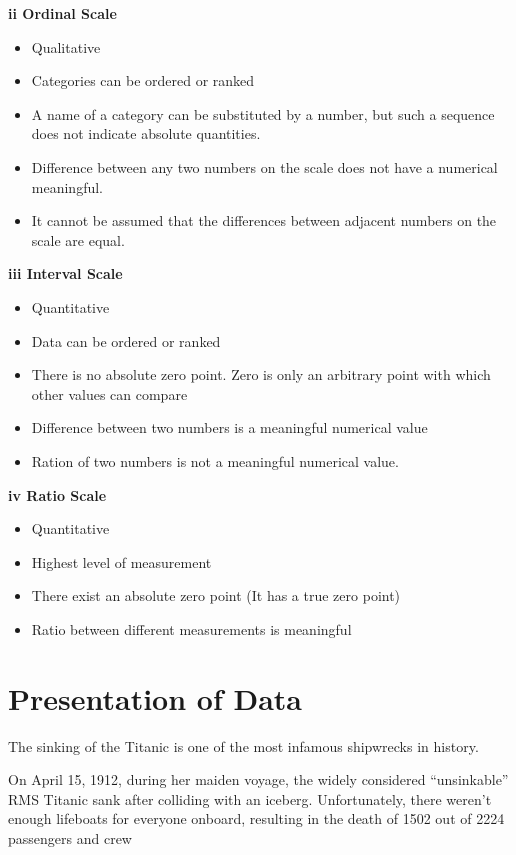 \documentclass[]{book}
\providecommand{\tightlist}{%
  \setlength{\itemsep}{0pt}\setlength{\parskip}{0pt}}
\begin{document}
\textbf{ii Ordinal Scale}

\begin{itemize}
\tightlist
\item
  Qualitative
\item
  Categories can be ordered or ranked
\item
  A name of a category can be substituted by a number, but such a sequence does not indicate absolute quantities.
\item
  Difference between any two numbers on the scale does not have a numerical meaningful.
\item
  It cannot be assumed that the differences between adjacent numbers on the scale are equal.
\end{itemize}

\textbf{iii Interval Scale}

\begin{itemize}
\tightlist
\item
  Quantitative
\item
  Data can be ordered or ranked
\item
  There is no absolute zero point. Zero is only an arbitrary point with which other values can compare
\item
  Difference between two numbers is a meaningful numerical value
\item
  Ration of two numbers is not a meaningful numerical value.
\end{itemize}

\textbf{iv Ratio Scale}

\begin{itemize}
\tightlist
\item
  Quantitative
\item
  Highest level of measurement
\item
  There exist an absolute zero point (It has a true zero point)
\item
  Ratio between different measurements is meaningful
\end{itemize}

\hypertarget{presentation-of-data}{%
\section{Presentation of Data}\label{presentation-of-data}}

The sinking of the Titanic is one of the most infamous shipwrecks in history.

On April 15, 1912, during her maiden voyage, the widely considered ``unsinkable'' RMS Titanic sank after colliding with an iceberg. Unfortunately, there weren't enough lifeboats for everyone onboard, resulting in the death of 1502 out of 2224 passengers and crew
\end{document}
